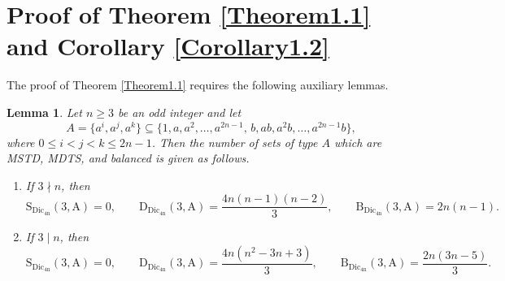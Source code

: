\documentclass[11pt,reqno]{amsart}
\numberwithin{equation}{section}
\newtheorem{lemma}[theorem]{Lemma}
\begin{document}
\section{Proof of Theorem \ref{Theorem1.1} and Corollary \ref{Corollary1.2}} \label{section-4}
The proof of Theorem \ref{Theorem1.1} requires the following auxiliary lemmas.

\begin{lemma}\label{Lemma1.4}
Let $n\geq3$ be an odd integer and let 
$$A=\{a^{i},a^{j},a^{k}\}\subseteq \{1,a,a^{2},\ldots,a^{2n-1},\, b,ab,a^{2}b,\ldots,a^{2n-1}b\},$$ where $0 \leq i<j< k\leq 2n-1$. Then the number of sets of type $A$ which are MSTD, MDTS, and balanced is given as follows.
\begin{enumerate}
    \item[\upshape(1)] If $3\nmid n$, then
$$\mathrm{S_{\mathrm{Dic_{4n}}}(3,A)}=0,\qquad\mathrm{D_{\mathrm{Dic_{4n}}}(3,A)}=\frac{4n(n-1)(n-2)}{3},\qquad\mathrm{B_{\mathrm{Dic_{4n}}}(3,A)}=2n(n-1).$$
\item[\upshape(2)] If $3\mid n$, then
$$ \mathrm{S_{\mathrm{Dic_{4n}}}(3,A)}=0,\qquad \mathrm{D_{\mathrm{Dic_{4n}}}(3,A)}=\frac{4n(n^{2}-3n+3)}{3},\qquad\mathrm{B_{\mathrm{Dic_{4n}}}(3,A)}=\frac{2n(3n-5)}{3}.$$
\end{enumerate}
\end{lemma}
\end{document}
